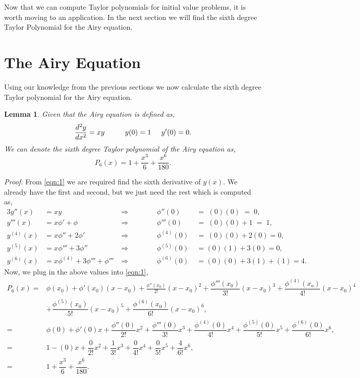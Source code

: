 \documentclass[12pt, letterpaper]{article}  %
\newtheorem{lem}[thrm]{Lemma}
\begin{document}
\newpage
Now that we can compute Taylor polynomials for initial value problems, it is worth moving to an application.
In the next section we will find the sixth degree Taylor Polynomial for the Airy equation.
\section{The Airy Equation}

Using our knowledge from the previous sections we now calculate the sixth degree Taylor polynomial for the Airy equation.
\begin{lem}\label{Le_3}
  Given that the Airy equation is defined as,\\
  $$
  \dfrac{d^2y}{dx^2} = xy\hspace{1cm} y(0) = 1\hspace{.5cm} y'(0) = 0.
  $$
  We can denote the sixth degree Taylor polynomial of the Airy equation as,
  $$
  P_6(x) = 1 + \dfrac{x^3}{6} + \dfrac{x^6}{180}.
  $$
\end{lem}
\textit{Proof.} From \ref{eqn:1} we are required find the sixth derivative of
$y(x)$. We already have the first and second, but we just need the rest which is computed as,
\begin{alignat*}{3}
  y''(x) &= xy &\ \Rightarrow\hspace{1cm}& &\phi''\left(0\right)\; &=\; (0)(0)\; =\; 0,\\
  y'''(x) &= x\phi' + \phi&\ \Rightarrow\hspace{1cm}&  
          &\phi'''\left(0\right)\; &=\; (0)(0) + 1\; =\; 1, \\
  y^{(4)}(x) &= x\phi'' + 2\phi' &\ \Rightarrow\hspace{1cm}&
             &\phi^{(4)}\left(0\right)\; &=\ (0)(0) + 2(0) = 0, \\
  y^{(5)}(x) &= x\phi''' + 3\phi'' &\ \Rightarrow\hspace{1cm}& 
             &\phi^{(5)}\left(0\right)\; &= (0)(1) + 3(0) = 0, \\
  y^{(6)}(x) &= x\phi^{(4)} + 3\phi''' + \phi'''&\ \Rightarrow\hspace{1cm}& 
             &\phi^{(6)}\left(0\right)\; &= (0)(0) + 3(1) + (1) = 4.
\end{alignat*}
Now, we plug in the above values into \ref{eqn:1},
\begin{align*}
  P_6(x) =& \phi(x_0) + \phi'(x_0)(x-x_0) + \frac{\phi''(x_0)}{2!}(x-x_0)^2 + \dfrac{\phi'''(x_0)}{3!}(x-x_0)^3 
  + \dfrac{\phi^{(4)}(x_o)}{4!}(x-x_0)^4 \\
          &+ \dfrac{\phi^{(5)}(x_0)}{5!}(x-x_0)^5 + \dfrac{\phi^{(6)}(x_0)}{6!}(x-x_0)^6, \\
  =& \phi(0) + \phi'(0)x + \dfrac{\phi''(0)}{2!}x^2 + \dfrac{\phi'''(0)}{3!}x^3 + \dfrac{\phi^{(4)}(0)}{4!}
  x^4 + \dfrac{\phi^{(5)}(0)}{5!}x^5 + \dfrac{\phi^{(6)}(0)}{6!}x^6, \\
  =& 1 - (0)x + \dfrac{0}{2!}x^2 + \dfrac{1}{3!}x^3 + \dfrac{0}{4!}x^4 + \dfrac{0}{5!}x^5 + 
  \dfrac{4}{6!}x^6, \\
  =& 1 + \dfrac{x^3}{6} + \dfrac{x^6}{180}. 
\end{align*}
\end{document}
